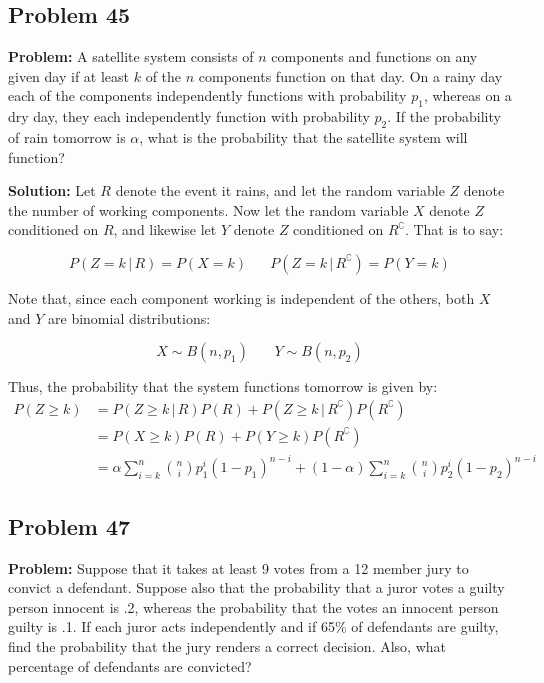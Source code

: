 \documentclass{article}
\newcommand*\pbar[0]{\,|\,}
\begin{document}
\subsection*{Problem 45}
\noindent\textbf{Problem:} A satellite system consists of $n$ components and functions on any given day if at least $k$ of the $n$ components function on that day. On a rainy day each of the components independently functions with probability $p_1$, whereas on a dry day, they each independently function with probability $p_2$. If the probability of rain tomorrow is $\alpha$, what is the probability that the satellite system will function? 
\bigskip

\noindent\textbf{Solution:} Let $R$ denote the event it rains, and let the random variable $Z$ denote the number of working components. Now let the random variable $X$ denote $Z$ conditioned on $R$, and likewise let $Y$ denote $Z$ conditioned on $R^\complement$. That is to say:

\begin{equation*}
    P(Z=k\pbar R)=P(X=k)\,\,\,\,\,\,\,\,\,\, P(Z=k\pbar R^\complement)=P(Y=k)
\end{equation*}

Note that, since each component working is independent of the others, both $X$ and $Y$ are binomial distributions:

\begin{equation*}
    X\sim B(n,p_1)\,\,\,\,\,\,\,\,\,\,\, Y\sim B(n,p_2)
\end{equation*}

Thus, the probability that the system functions tomorrow is given by:
\begin{align*}
    P(Z\ge k)&=P(Z\ge k\pbar R)P(R)+P(Z\ge k\pbar R^\complement)P(R^\complement)\\
    &=P(X\ge k)P(R)+P(Y\ge k)P(R^\complement)\tag{def. of $X$ and $Y$}\\
    &=\alpha\sum_{i=k}^n\binom{n}{i}p_1^i(1-p_1)^{n-i}+(1-\alpha)\sum_{i=k}^n\binom{n}{i}p_2^i(1-p_2)^{n-i}\tag{binomial distribution}
\end{align*}

\subsection*{Problem 47}
\noindent\textbf{Problem:} Suppose that it takes at least 9 votes from a 12 member jury to convict a defendant. Suppose also that the probability that a juror votes a guilty person innocent is .2, whereas the probability that the votes an innocent person guilty is .1. If each juror acts independently and if 65\% of defendants are guilty, find the probability that the jury renders a correct decision. Also, what percentage of defendants are convicted?
\bigskip
\end{document}
